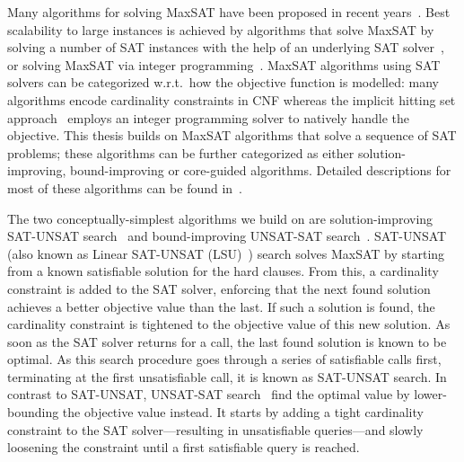 Many algorithms for solving MaxSAT have been proposed in recent years~\autocites{DBLP:conf/sat/FuM06,DBLP:journals/jsat/BerreP10,DBLP:conf/cp/MorgadoDM14,DBLP:journals/jsat/IgnatievMM19,DBLP:conf/cp/DaviesB11}.
Best scalability to large instances is achieved by algorithms that solve MaxSAT by solving a number of SAT instances with the help of an underlying SAT solver~\autocite{handbook2-cdcl}, or solving MaxSAT via integer programming~\autocite{handbook2-maxsat}.
MaxSAT algorithms using SAT solvers can be categorized w.r.t.\ how the objective function is modelled:
many algorithms encode cardinality constraints in CNF whereas the implicit hitting set approach~\autocites{DBLP:conf/cp/DaviesB13,DBLP:conf/sat/DaviesB13,DBLP:conf/cp/DaviesB11,DBLP:conf/sat/BergBP20} employs an integer programming solver to natively handle the objective.
This thesis builds on MaxSAT algorithms that solve a sequence of SAT problems;
these algorithms can be further categorized as either solution-improving, bound-improving or core-guided algorithms.
Detailed descriptions for most of these algorithms can be found in~\autocite{handbook2-maxsat}.

The two conceptually-simplest algorithms we build on are solution-improving SAT-UNSAT search~\autocite{DBLP:journals/jsat/BerreP10} and bound-improving UNSAT-SAT search~\autocite{DBLP:conf/sat/FuM06}.
SAT-UNSAT (also known as Linear SAT-UNSAT (LSU)~\autocite{handbook2-maxsat}) search solves MaxSAT by starting from a known satisfiable solution for the hard clauses.
From this, a cardinality constraint is added to the SAT solver, enforcing that the next found solution achieves a better objective value than the last.
If such a solution is found, the cardinality constraint is tightened to the objective value of this new solution.
As soon as the SAT solver returns \unsat{} for a call, the last found solution is known to be optimal.
As this search procedure goes through a series of satisfiable calls first, terminating at the first unsatisfiable call, it is known as SAT-UNSAT search.
In contrast to SAT-UNSAT, UNSAT-SAT search~\autocites{DBLP:conf/sat/FuM06,DBLP:journals/tcad/XuRS03} find the optimal value by lower-bounding the objective value instead.
It starts by adding a tight cardinality constraint to the SAT solver---resulting in unsatisfiable queries---and slowly loosening the constraint until a first satisfiable query is reached.

